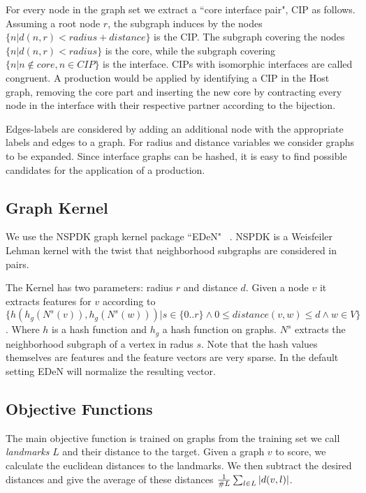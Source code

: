 \documentclass{esannV2} \usepackage[dvips]{graphicx}
\begin{document}
For every node in the graph set we extract a ``core interface pair", CIP as
follows.  Assuming a root node $r$, the subgraph induces by the nodes $\{ n |
d(n,r) < radius+distance \}$ is the CIP.  The subgraph covering the nodes $\{ n
| d(n,r) < radius \}$ is the core, while the subgraph covering $\{ n | n \notin
core , n \in CIP \}$ is the interface.  CIPs with isomorphic interfaces are
called congruent.  A production would be applied by identifying a CIP in the
Host graph, removing the core part and inserting the new core by contracting
every node in the interface with their respective partner according to the
bijection.

Edges-labels are considered by adding an additional node with the appropriate
labels and edges to a graph. For radius and distance variables we consider
graphs to be expanded.  Since interface graphs can be hashed, it is easy to
find possible candidates for the application of a production. 


\subsection{Graph Kernel}
We use the NSPDK graph kernel package ``EDeN" ~\cite{costa2010fast}. NSPDK is a
Weisfeiler Lehman \cite{weisfeiler} kernel with the twist that neighborhood
subgraphs are considered in pairs.

The Kernel has two parameters: radius $r$ and distance $d$. Given a node $v$ it
extracts features for $v$ according to $\{ h(h_g(N^s(v)),h_g(N^s(w))) | s \in
\{0..r\} \wedge 0 \leq distance(v,w) \leq d  \wedge w\in V \}$.  Where $h$ is a
hash function and $h_g$ a hash function on graphs. $N^s$ extracts the
neighborhood subgraph of a vertex in radus $s$. Note that the hash values
themselves are features and the feature vectors are very sparse. In the default
setting EDeN will normalize the resulting vector.

\subsection{Objective Functions}

The main objective function is trained on graphs from the training set we call
\emph{landmarks} $L$ and their distance to the target.  Given a graph $v$ to
score, we calculate the euclidean distances to the landmarks. We then subtract
the desired distances and give the average of these distances $ {1 \over{\#L}
}\sum_{l \in L} |d(v,l)|$.
\end{document}
